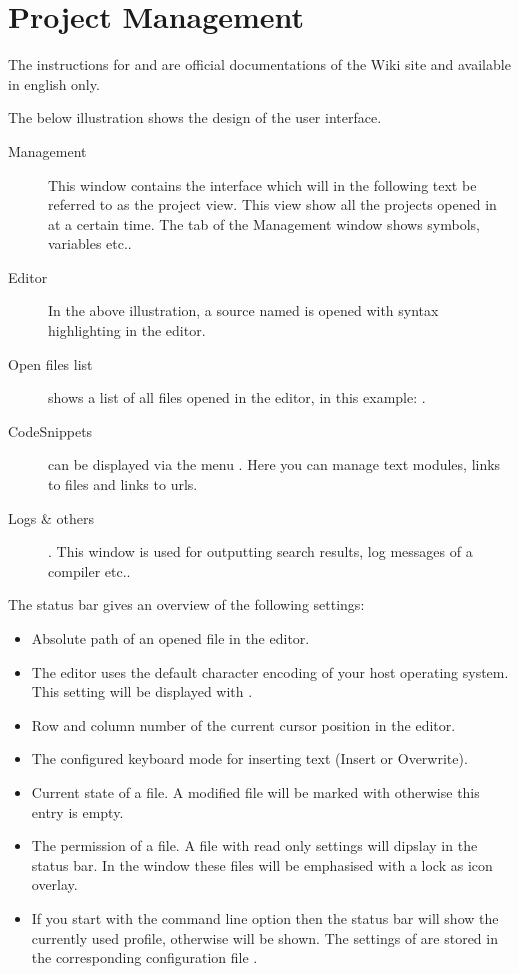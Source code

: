 \chapter{\codeblocks Project Management}

The instructions for  and  are official documentations of the \codeblocks Wiki site and available in english only.

The below illustration shows the design of the \codeblocks user interface.


\begin{description}
\item[Management] This window contains the interface  which will in the following text be referred to as the project view. This view show all the projects opened in \codeblocks at a certain time. The  tab of the Management window shows symbols, variables etc..
\item[Editor] In the above illustration, a source named  is opened with syntax highlighting in the editor.
\item[Open files list] shows a list of all files opened in the editor, in this example: .
\item[CodeSnippets] can be displayed via the menu . Here you can manage text modules, links to files and links to urls.
\item[Logs \& others]. This window is used for outputting search results, log messages of a compiler etc..
\end{description}

The status bar gives an overview of the following settings:

\begin{itemize}
\item Absolute path of an opened file in the editor.
\item The editor uses the default character encoding of your host operating system. This setting will be displayed with .
\item Row and column number of the current cursor position in the editor.
\item The configured keyboard mode for inserting text (Insert or Overwrite).
\item Current state of a file. A modified file will be marked with  otherwise this entry is empty.
\item The permission of a file. A file with read only settings will dipslay  in the status bar. In the window  these files will be emphasised with a lock as icon overlay.
\item If you start \codeblocks with the command line option  then the status bar will show the currently used profile, otherwise  will be shown. The settings of \codeblocks are stored in the corresponding configuration file .
\end{itemize}

